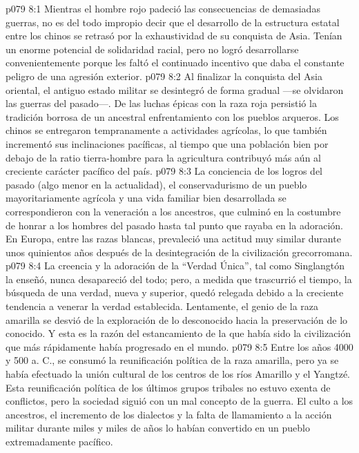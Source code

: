 \vs p079 8:1 Mientras el hombre rojo padeció las consecuencias de demasiadas guerras, no es del todo impropio decir que el desarrollo de la estructura estatal entre los chinos se retrasó por la exhaustividad de su conquista de Asia. Tenían un enorme potencial de solidaridad racial, pero no logró desarrollarse convenientemente porque les faltó el continuado incentivo que daba el constante peligro de una agresión exterior.
\vs p079 8:2 Al finalizar la conquista del Asia oriental, el antiguo estado militar se desintegró de forma gradual ---se olvidaron las guerras del pasado---. De las luchas épicas con la raza roja persistió la tradición borrosa de un ancestral enfrentamiento con los pueblos arqueros. Los chinos se entregaron tempranamente a actividades agrícolas, lo que también incrementó sus inclinaciones pacíficas, al tiempo que una población bien por debajo de la ratio tierra\hyp{}hombre para la agricultura contribuyó más aún al creciente carácter pacífico del país.
\vs p079 8:3 La conciencia de los logros del pasado (algo menor en la actualidad), el conservadurismo de un pueblo mayoritariamente agrícola y una vida familiar bien desarrollada se correspondieron con la veneración a los ancestros, que culminó en la costumbre de honrar a los hombres del pasado hasta tal punto que rayaba en la adoración. En Europa, entre las razas blancas, prevaleció una actitud muy similar durante unos quinientos años después de la desintegración de la civilización grecorromana.
\vs p079 8:4 La creencia y la adoración de la “Verdad Única”, tal como Singlangtón la enseñó, nunca desapareció del todo; pero, a medida que trascurrió el tiempo, la búsqueda de una verdad, nueva y superior, quedó relegada debido a la creciente tendencia a venerar la verdad establecida. Lentamente, el genio de la raza amarilla se desvió de la exploración de lo desconocido hacia la preservación de lo conocido. Y esta es la razón del estancamiento de la que había sido la civilización que más rápidamente había progresado en el mundo.
\vs p079 8:5 \pc Entre los años 4000 y 500 a. C., se consumó la reunificación política de la raza amarilla, pero ya se había efectuado la unión cultural de los centros de los ríos Amarillo y el Yangtzé. Esta reunificación política de los últimos grupos tribales no estuvo exenta de conflictos, pero la sociedad siguió con un mal concepto de la guerra. El culto a los ancestros, el incremento de los dialectos y la falta de llamamiento a la acción militar durante miles y miles de años lo habían convertido en un pueblo extremadamente pacífico.
